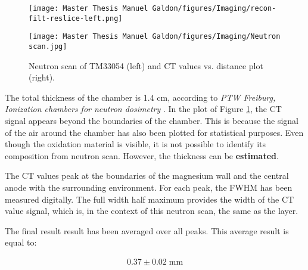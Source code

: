 \begin{figure}[!h]
\centering
\begin{minipage}{0.45\textwidth}
    \centering
    \texttt{[image: Master Thesis Manuel Galdon/figures/Imaging/recon-filt-reslice-left.png]}
\end{minipage}
\hfill
\begin{minipage}{0.53\textwidth}
    \centering
    \texttt{[image: Master Thesis Manuel Galdon/figures/Imaging/Neutron scan.jpg]}
\end{minipage}
\caption{Neutron scan of TM33054 (left) and CT values vs. distance plot (right).}
\label{fig:Neutron scan vs plot}
\end{figure}

\newpage
The total thickness of the chamber is 1.4 \unit{\cm}, according to \textit{PTW Freiburg, Ionization chambers for neutron dosimetry} \cite{PTWKammerBauplan}. In the plot of Figure \ref{fig:Neutron scan vs plot}, the CT signal appears beyond the boundaries of the chamber. This is because the signal of the air around the chamber has also been plotted for statistical purposes. Even though the oxidation material is visible, it is not possible to identify its composition from neutron scan. However, the thickness can be \textbf{estimated}.

The CT values peak at the boundaries of the magnesium wall and the central anode with the surrounding environment. For each peak, the FWHM has been measured digitally. The full width half maximum provides the width of the CT value signal, which is, in the context of this neutron scan, the same as the layer.

The final result result has been averaged over all peaks. This average result is equal to:

\begin{align}
\label{eq:Averaged FWHM}
    0.37  	\pm 0.02 \; \unit{\milli\meter}
\end{align}

